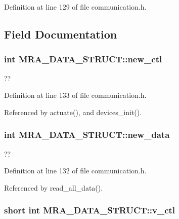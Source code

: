 Definition at line 129 of file communication.h.



\subsection{Field Documentation}
\hypertarget{structMRA__DATA__STRUCT_a5b1af89ee717f5b14c18e8ac12e93e75}{
\subsubsection[{new\_\-ctl}]{\setlength{\rightskip}{0pt plus 5cm}int {\bf MRA\_\-DATA\_\-STRUCT::new\_\-ctl}}}
\label{structMRA__DATA__STRUCT_a5b1af89ee717f5b14c18e8ac12e93e75}


?? 



Definition at line 133 of file communication.h.



Referenced by actuate(), and devices\_\-init().

\hypertarget{structMRA__DATA__STRUCT_afca6e851d302f3a786885a4e1eec79d7}{
\subsubsection[{new\_\-data}]{\setlength{\rightskip}{0pt plus 5cm}int {\bf MRA\_\-DATA\_\-STRUCT::new\_\-data}}}
\label{structMRA__DATA__STRUCT_afca6e851d302f3a786885a4e1eec79d7}


?? 



Definition at line 132 of file communication.h.



Referenced by read\_\-all\_\-data().

\hypertarget{structMRA__DATA__STRUCT_a64b4e6bb604e58de593a60c87942b966}{
\subsubsection[{v\_\-ctl}]{\setlength{\rightskip}{0pt plus 5cm}short int {\bf MRA\_\-DATA\_\-STRUCT::v\_\-ctl}}}
\label{structMRA__DATA__STRUCT_a64b4e6bb604e58de593a60c87942b966}



